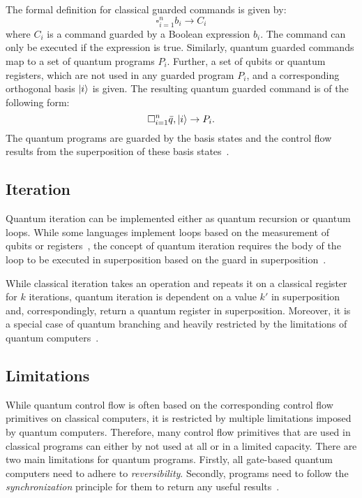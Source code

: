 The formal definition for classical guarded commands is given by:
\begin{equation*}
    \square^n_{i=1} b_i \to C_i
\end{equation*}
where $C_i$ is a command guarded by a Boolean expression $b_i$. The command can only be executed if the expression is true. Similarly, quantum guarded commands map to a set of quantum programs $P_i$. Further, a set of qubits or quantum registers, which are not used in any guarded program $P_i$, and a corresponding orthogonal basis $\ket{i}$ is given. The resulting quantum guarded command is of the following form:
\begin{equation*}
    \square^n_{i=1} \bar{q}, \ket{i} \to P_i.
\end{equation*} 
The quantum programs are guarded by the basis states and the control flow results from the superposition of these basis states~\cite{YYF12}. 

\subsection{Iteration}
\label{sec:background_iteration}
Quantum iteration can be implemented either as quantum recursion or quantum loops. While some languages implement loops based on the measurement of qubits or registers~\cite{Ying11}, the concept of quantum iteration requires the body of the loop to be executed in superposition based on the guard in superposition~\cite{YYF12}.

While classical iteration takes an operation and repeats it on a classical register for $k$ iterations, quantum iteration is dependent on a value $k'$ in superposition and, correspondingly, return a quantum register in superposition. Moreover, it is a special case of quantum branching and heavily restricted by the limitations of quantum computers~\cite{YVC24}.    

\subsection{Limitations}
\label{sec:background_limitations}	
While quantum control flow is often based on the corresponding control flow primitives on classical computers, it is restricted by multiple limitations imposed by quantum computers. Therefore, many control flow primitives that are used in classical programs can either by not used at all or in a limited capacity. There are two main limitations for quantum programs. Firstly, all gate-based quantum computers need to adhere to \emph{reversibility}. Secondly, programs need to follow the \emph{synchronization} principle for them to return any useful results~\cite{YVC24}.

